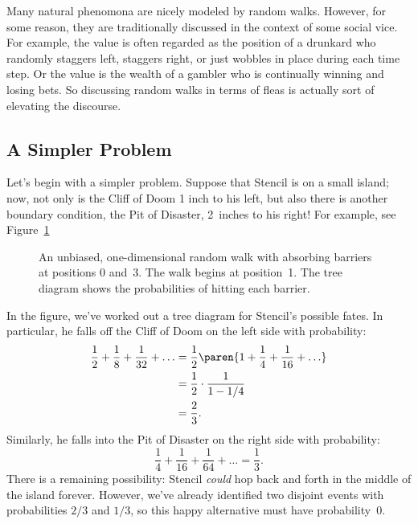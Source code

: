 Many natural phenomona are nicely modeled by random walks.  However,
for some reason, they are traditionally discussed in the context of
some social vice.  For example, the value is often regarded as the
position of a drunkard who randomly staggers left, staggers right, or
just wobbles in place during each time step.  Or the value is the
wealth of a gambler who is continually winning and losing bets.  So
discussing random walks in terms of fleas is actually sort of
elevating the discourse.

\subsection{A Simpler Problem}

Let's begin with a simpler problem.  Suppose that Stencil is on a
small island; now, not only is the Cliff of Doom 1 inch to his left,
but also there is another boundary condition, the Pit of Disaster,
2~inches to his right!  For example, see Figure~\ref{fig:19P1}

\begin{figure}


\caption{An unbiased, one-dimensional random walk with absorbing
  barriers at positions 0 and~3.  The walk begins at position~1.  The
  tree diagram shows the probabilities of hitting each barrier.}

\label{fig:19P1}

\end{figure}

In the figure, we've worked out a tree diagram for Stencil's possible
fates.  In particular, he falls off the Cliff of Doom on the left side
with probability:
%
\begin{align*}
\frac{1}{2} + \frac{1}{8} + \frac{1}{32} + \ldots
    & = \frac{1}{2} \paren{1 + \frac{1}{4} + \frac{1}{16} + \ldots} \\
    & = \frac{1}{2} \cdot \frac{1}{1 - 1/4} \\
    & = \frac{2}{3}.
\end{align*}
%
Similarly, he falls into the Pit of Disaster on the right side with
probability:
%
\[
\frac{1}{4} + \frac{1}{16} + \frac{1}{64} + \ldots = \frac{1}{3}.
\]
%
There is a remaining possibility: Stencil \emph{could} hop back and
forth in the middle of the island forever.  However, we've already
identified two disjoint events with probabilities $2/3$ and $1/3$, so
this happy alternative must have probability~0.

